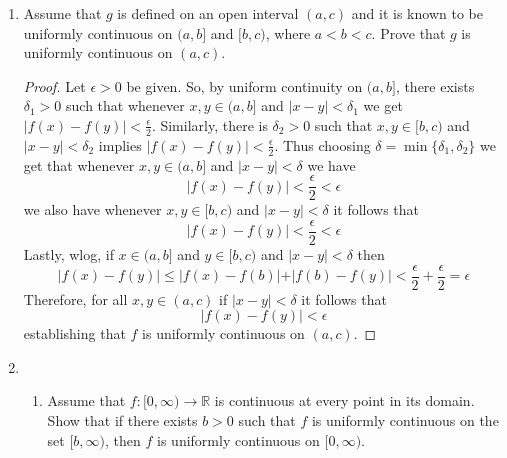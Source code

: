 \begin{enumerate}
\begin{proof}
\begin{enumerate}
        \item Let \( f: (0,1) \rightarrow \mathbb{R} \) be defined by
        \[
        f(x) = -\left(x-\frac{1}{2}\right)^{2}+\frac{1}{2}
        \]
        It is an easy matter to show that \( f \) is continuous on \( (0,1) \) and that it attains a maximum but no minimum.
    \end{enumerate}
    \end{proof}
    
    \item Assume that \( g \) is defined on an open interval \( (a,c) \) and it is known to be uniformly continuous on \( (a,b] \) and \( [b,c) \), where \( a < b < c \). Prove that \( g \) is uniformly continuous on \( (a,c) \). 
    \begin{proof}
    Let \( \epsilon > 0 \) be given. So, by uniform continuity on \( (a,b] \), there exists \( \delta_{1} > 0 \) such that whenever \( x,y \in (a,b] \) and \( \vert x-y \vert < \delta_{1} \) we get \( \vert f(x) - f(y) \vert < \frac{\epsilon}{2} \). Similarly, there is \( \delta_{2} > 0 \) such that \( x,y \in [b,c) \) and \( \vert x-y \vert < \delta_{2} \) implies \( \vert f(x) - f(y) \vert < \frac{\epsilon}{2} \). Thus choosing \( \delta = \min\{ \delta_{1}, \delta_{2} \} \) we get that whenever \( x,y \in (a,b] \) and \( \vert x-y \vert < \delta \) we have
    \[
    \vert f(x) - f(y) \vert < \frac{\epsilon}{2} < \epsilon
    \]
    we also have whenever \( x,y \in [b,c) \) and \( \vert x-y \vert < \delta \) it follows that 
    \[
    \vert f(x) - f(y) \vert < \frac{\epsilon}{2} < \epsilon
    \]
    Lastly, wlog, if \( x \in (a,b] \) and \( y \in [b,c) \) and \( \vert x-y \vert < \delta \) then
    \[
    \vert f(x) - f(y) \vert \leq \vert f(x) - f(b) \vert + \vert f(b) - f(y) \vert  < \frac{\epsilon}{2} + \frac{\epsilon}{2} = \epsilon
    \]
    Therefore, for all \( x,y \in (a,c) \) if \( \vert x-y \vert < \delta \) it follows that
    \[
    \vert f(x) - f(y) \vert < \epsilon
    \]
    establishing that \( f \) is uniformly continuous on \( (a,c) \). 
    \end{proof}
    
    \item 
    \begin{enumerate}
        \item Assume that \( f:[0,\infty) \rightarrow \mathbb{R} \) is continuous at every point in its domain. Show that if there exists \( b > 0 \) such that \( f \) is uniformly continuous on the set \( [b,\infty) \), then \( f \) is uniformly continuous on \( [0,\infty) \).  
        

\end{enumerate}
\end{enumerate}
